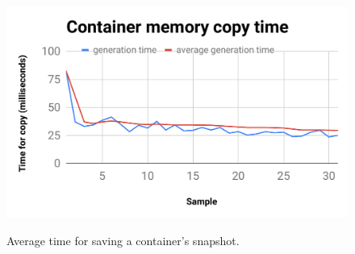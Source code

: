 \documentclass[10pt,journal,compsoc]{IEEEtran}
\newcommand{\marcos}[1]{{\color{green}{MARCOS: #1}}}
\begin{document}
%
%

\begin{figure}[tb!]
\footnotesize
\caption{Average time for saving a container's snapshot.
}
\includegraphics[center,scale=0.45]{memoria_copia_ieee.pdf}
\centering
\label{fig:memoria_copia}
\end{figure}
\end{document}
